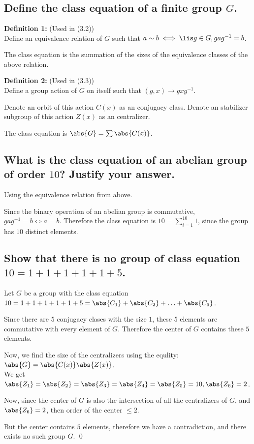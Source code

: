 \section[Problem 3]{
}  
    \subsection[(i)]{
        Define the class equation of a finite group $G$.
    }
        \textbf{Definition 1:} (Used in (3.2))\\
        Define an equivalence relation of $G$ such that $a \sim b \iff \lis g \in G, gag^{-1} = b$.

        The class equation is the summation of the sizes of the equivalence classes of the above relation.

        \textbf{Definition 2:} (Used in (3.3))\\
        Define a group action of $G$ on itself such that $(g,x) \to gxg^{-1}$.

        Denote an orbit of this action $C(x)$ as an conjugacy class.
        Denote an stabilizer subgroup of this action $Z(x)$ as an centralizer.

        The class equation is $\abs{G} = \sum \abs{C(x)}$.


    \subsection[(ii)]{
        What is the class equation of an abelian group of order $10$? Justify your answer.
    }
        Using the equivalence relation from above.

        Since the binary operation of an abelian group is commutative, $gag^{-1} = b \iff a = b$.
        Therefore the class equation is $10 = \sum_{i=1}^{10} 1$, 
        since the group has $10$ distinct elements. 

    \subsection[(iii)]{
        Show that there is no group of class equation $10 = 1+1+1+1+1+5$.
    }   
        Let $G$ be a group with the class equation 
        $10 = 1+1+1+1+1+5 = \abs{C_1} + \abs{C_2}+ \hdots + \abs{C_6}$.

        Since there are $5$ conjugacy clases with the size $1$,
        these $5$ elements are commutative with every element of $G$.
        Therefore the center of $G$ contains these $5$ elements.


        Now, we find the size of the centralizers using the equlity: $\abs{G} = \abs{C(x)} \abs{Z(x)}$.\\
        We get $\abs{Z_1} = \abs{Z_2} = \abs{Z_3} = \abs{Z_4} = \abs{Z_5} =  10 , \abs{Z_6} = 2$.

        Now, since the center of $G$ is also the intersection of all the centralizers of $G$,
        and $\abs{Z_6} = 2$, then order of the center $\leq 2$.

        But the center contains $5$ elements, therefore we have a contradiction, and there exists no such 
        group $G$.
        \qed


